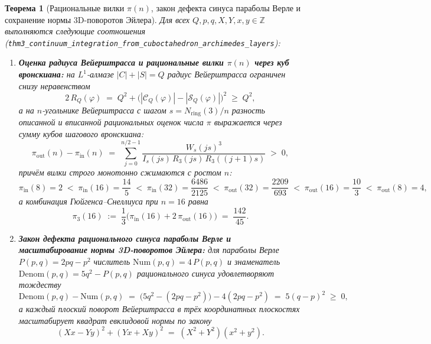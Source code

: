 \documentclass[11pt,a4paper]{article}
\theoremstyle{plain}
\newtheorem{theorem}{Теорема}[section]
\theoremstyle{definition}
\begin{document}
\begin{theorem}[Рациональные вилки $\pi(n)$, закон дефекта синуса параболы Верле и сохранение нормы 3D-поворотов Эйлера]
\label{thm:main-3b}
Для всех $Q, p, q, X, Y, x, y \in \mathbb{Z}$ выполняются следующие соотношения (\texttt{thm3\_continuum\_integration\_from\_cuboctahedron\_archimedes\_layers}):
\begin{enumerate}[label=\textbf{(\roman*)},leftmargin=*]
\item \textbf{Оценка радиуса Вейерштрасса и рациональные вилки $\pi(n)$ через куб вронскиана:}
  на $L^1$-алмазе $|C| + |S| = Q$ радиус Вейерштрасса ограничен снизу неравенством
  \begin{equation}
    \label{eq:parallelogram-radius-bound}
    2\,R_Q(\varphi) \;=\; Q^2 + \bigl(|\mathcal{C}_Q(\varphi)| - |\mathcal{S}_Q(\varphi)|\bigr)^2 \;\ge\; Q^2,
  \end{equation}
  а на $n$-угольнике Вейерштрасса с шагом $s = N_{\mathrm{ring}}(3)/n$ разность описанной и вписанной рациональных оценок числа $\pi$ выражается через сумму кубов шагового вронскиана:
  \begin{equation}
    \label{eq:pi-wronskian-cube-gap}
    \pi_{\mathrm{out}}(n) - \pi_{\mathrm{in}}(n) \;=\; \sum_{j=0}^{n/2-1}\frac{W_s(js)^3}{I_s(js)\,R_3(js)\,R_3((j+1)s)} \;>\; 0,
  \end{equation}
  причём вилки строго монотонно сжимаются с ростом $n$:
  \begin{equation}
    \label{eq:pi-nested-chain}
    \pi_{\mathrm{in}}(8) = 2 \;<\; \pi_{\mathrm{in}}(16) = \frac{14}{5} \;<\; \pi_{\mathrm{in}}(32) = \frac{6486}{2125} \;<\; \pi_{\mathrm{out}}(32) = \frac{2209}{693} \;<\; \pi_{\mathrm{out}}(16) = \frac{10}{3} \;<\; \pi_{\mathrm{out}}(8) = 4,
  \end{equation}
  а комбинация Гюйгенса--Снеллиуса при $n = 16$ равна
  \begin{equation}
    \label{eq:huygens-snellius-16}
    \pi_3(16) \;:=\; \frac{1}{3}\bigl(\pi_{\mathrm{in}}(16) + 2\,\pi_{\mathrm{out}}(16)\bigr) \;=\; \frac{142}{45}.
  \end{equation}

\item \textbf{Закон дефекта рационального синуса параболы Верле и масштабирование нормы 3D-поворотов Эйлера:}
  для параболы Верле $P(p, q) = 2pq - p^2$ числитель $\mathrm{Num}(p, q) = 4\,P(p, q)$ и знаменатель $\mathrm{Denom}(p, q) = 5q^2 - P(p, q)$ рационального синуса удовлетворяют тождеству
  \begin{equation}
    \label{eq:verlet-sine-defect}
    \mathrm{Denom}(p, q) - \mathrm{Num}(p, q) \;=\; \bigl(5q^2 - (2pq - p^2)\bigr) - 4(2pq - p^2) \;=\; 5(q - p)^2 \;\ge\; 0,
  \end{equation}
  а каждый плоский поворот Вейерштрасса в трёх координатных плоскостях масштабирует квадрат евклидовой нормы по закону
  \begin{equation}
    \label{eq:euler-norm-scaling}
    (Xx - Yy)^2 + (Yx + Xy)^2 \;=\; (X^2 + Y^2)(x^2 + y^2).
  \end{equation}
\end{enumerate}
\end{theorem}
\end{document}
